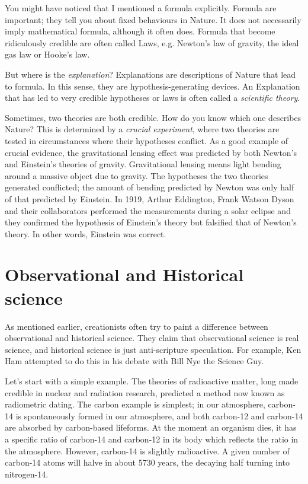 \begin{multicols}{2}
You might have noticed that I mentioned a formula explicitly. Formula are important; they tell you about fixed behaviours in Nature. It does not
necessarily imply mathematical formula, although it often does. Formula that become ridiculously credible are often called Laws, e.g. Newton's
law of gravity, the ideal gas law or Hooke's law.


But where is the \emph{explanation}? Explanations are descriptions of Nature that lead to formula. In this sense, they are hypothesis-generating
devices. An Explanation that has led to very credible hypotheses or laws is often called a \emph{scientific theory}.


Sometimes, two theories are both credible. How do you know which one describes Nature? This is determined by a \emph{crucial experiment}, where
two theories are tested in circumstances where their hypotheses conflict. As a good example of crucial evidence, the gravitational lensing effect
was predicted by both Newton's and Einstein's theories of gravity. Gravitational lensing means light bending around a massive object due to gravity.
The hypotheses the two theories generated conflicted; the amount of bending predicted by Newton was only half of that predicted by Einstein. In 1919,
Arthur Eddington, Frank Watson Dyson and their collaborators performed the measurements during a solar eclipse and they confirmed the
hypothesis of Einstein's theory but falsified that of Newton's theory. In other words, Einstein was correct.

\section{Observational and Historical science}

As mentioned earlier, creationists often try to paint a difference between observational and historical science. They claim that observational science is real
science, and historical science is just anti-scripture speculation. For example, Ken Ham attempted to do this in his debate with Bill Nye the Science
Guy.


Let's start with a simple example. The theories of radioactive matter, long made credible in nuclear and radiation research, predicted a method
now known as radiometric dating. The carbon example is simplest; in our atmosphere, carbon-14 is spontaneously formed in our atmosphere, and both
carbon-12 and carbon-14 are absorbed by carbon-based lifeforms. At the moment an organism dies, it has a specific ratio of carbon-14 and carbon-12
in its body which reflects the ratio in the atmosphere. However, carbon-14 is slightly radioactive. A given number of carbon-14 atoms will halve
in about 5730 years, the decaying half turning into nitrogen-14. 



\end{multicols}
